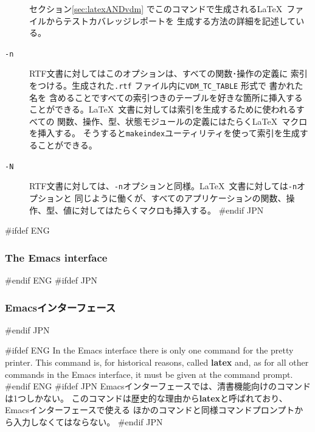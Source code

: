 \documentclass[\pformat,12pt]{article}
\begin{document}
\begin{description}
  セクション\ref{sec:latexANDvdm} でこのコマンドで生成される\LaTeX\ ファイルからテストカバレッジレポートを
  生成する方法の詳細を記述している。

\item[{\tt -n}]
  RTF文書に対してはこのオプションは、すべての関数･操作の定義に
  索引をつける。生成された{\tt .rtf} ファイル内に\texttt{VDM\_TC\_TABLE} 形式で
  書かれた
   名を
  含めることですべての索引つきのテーブルを好きな箇所に挿入する
  ことができる。\LaTeX\ 文書に対しては索引を生成するために使われるすべての
  関数、操作、型、状態モジュールの定義にはたらく\LaTeX\ マクロを挿入する。
  そうすると{\tt makeindex}ユーティリティを使って索引を生成することができる。

\item[{\tt -N}]
  RTF文書に対しては、{\tt -n}オプションと同様。\LaTeX\ 文書に対しては{\tt -n}オプションと
  同じように働くが、すべてのアプリケーションの関数、操作、型、値に対してはたらくマクロも挿入する。
#endif JPN

\end{description}

#ifdef ENG
\subsubsection{The Emacs interface}
#endif ENG
#ifdef JPN
\subsubsection{Emacsインターフェース}
#endif JPN

#ifdef ENG
In the Emacs interface there is only one command for the pretty
printer. This command is, for historical reasons, called \textbf{latex}
and, as for all other commands in the Emacs interface, it must be given at
the command prompt.
#endif ENG
#ifdef JPN
Emacsインターフェースでは、清書機能向けのコマンドは1つしかない。
このコマンドは歴史的な理由から\textbf{latex}と呼ばれており、Emacsインターフェースで使える
ほかのコマンドと同様コマンドプロンプトから入力しなくてはならない。
#endif JPN
\end{document}
